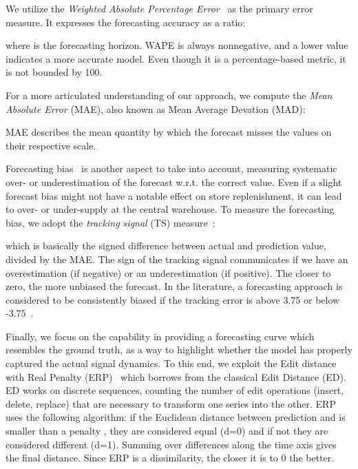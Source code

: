 \documentclass{article}
\begin{document}
We utilize the \emph{Weighted  Absolute Percentage Error}~\cite{hyndman2008forecasting} as the primary error measure. It expresses the forecasting accuracy as a ratio:

where  is the forecasting horizon. WAPE is always nonnegative, and a lower value indicates a more accurate model. Even though it is a percentage-based metric, it is not bounded by 100.

For a more articulated understanding of our approach, we compute the \emph{Mean Absolute Error} (MAE), also known as Mean Average Devation (MAD):

MAE describes the mean quantity by which the forecast misses the values on their respective scale.

Forecasting bias~\cite{brown2004smoothing} is another aspect to take into account, measuring systematic over- or underestimation of the forecast w.r.t. the correct value. Even if a slight forecast bias might not have a notable effect on store replenishment, it can lead to over- or under-supply at the central warehouse. To measure the forecasting bias, we adopt the \emph{tracking signal} (TS) measure~\cite{brown2004smoothing,nahmias2009production}:

which is basically the signed difference between actual and prediction value, divided by the MAE. The sign of the tracking signal communicates if we have an overestimation (if negative) or an underestimation (if positive). The closer to zero, the more unbiased the forecast. In the literature, a forecasting approach is considered to be consistently biased if the tracking error is above 3.75 or below -3.75~\cite{brown2004smoothing,nahmias2009production}.

Finally, we focus on the capability in providing a forecasting curve which resembles the ground truth, as a way to highlight whether the model has properly captured the actual signal dynamics. To this end, we exploit the Edit distance with Real Penalty (ERP)~\cite{chen2004marriage} which borrows from the classical Edit Distance (ED). ED works on discrete sequences, counting the number of edit operations (insert, delete, replace) that are necessary to transform one series into the other. ERP uses the following algorithm: if the Euclidean distance between prediction  and  is smaller than a penalty , they are considered equal (d=0) and if not they are considered different (d=1). Summing over differences along the time axis gives the final distance. Since ERP is a dissimilarity, the closer it is to 0 the better.
\end{document}
